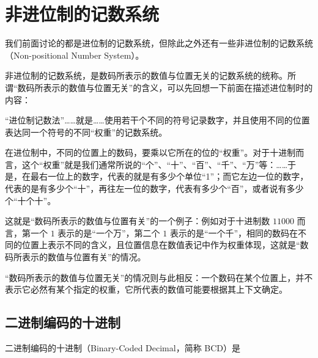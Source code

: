 \section{非进位制的记数系统}\label{sec:NumberSystemBasics/NonPositional}
    我们前面讨论的都是进位制的记数系统，但除此之外还有一些非进位制的记数系统（Non-positional Number System）。

    非进位制的记数系统，是数码所表示的数值与位置无关的记数系统的统称。所谓“数码所表示的数值与位置无关”的含义，可以先回想一下前面在描述进位制时的内容：

    \begin{displayquote}
        “进位制记数法”……就是……使用若干个不同的符号记录数字，并且使用不同的位置表达同一个符号的不同“权重”的记数系统。

        在进位制中，不同的位置上的数码，要乘以它所在的位的“权重”。对于十进制而言，这个“权重”就是我们通常所说的“个”、“十”、“百”、“千”、“万”等：……于是，在最右一位上的数字，代表的就是有多少个单位“1”；而它左边一位的数字，代表的是有多少个“十”，再往左一位的数字，代表有多少个“百”，或者说有多少个“十个十”。
    \end{displayquote}

    这就是“数码所表示的数值与位置有关”的一个例子：例如对于十进制数 $11000$ 而言，第一个 $1$ 表示的是“一个万”，第二个 $1$ 表示的是“一个千”，相同的数码在不同的位置上表示不同的含义，且位置信息在数值表记中作为权重体现，这就是“数码所表示的数值与位置有关”的情况。

    “数码所表示的数值与位置无关”的情况则与此相反：一个数码在某个位置上，并不表示它必然有某个指定的权重，它所代表的数值可能要根据其上下文确定。

    \subsection{二进制编码的十进制}\label{subsec:NumberSystemBasics/NonPositional/BinaryCodedDecimal}
        二进制编码的十进制（Binary-Coded Decimal，简称 BCD）是
